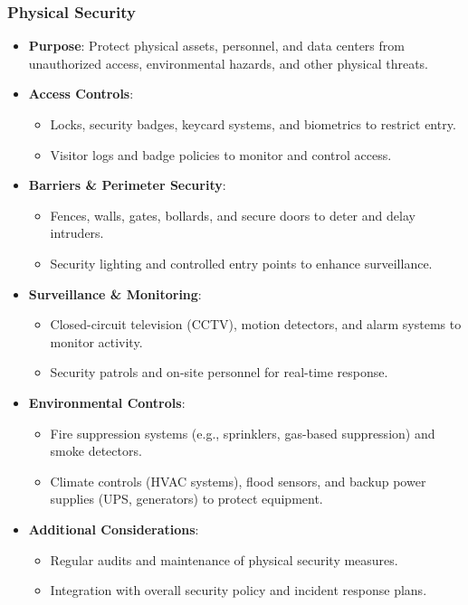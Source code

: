\documentclass[11pt]{article}
\begin{document}
\subsubsection{Physical Security}
\label{sec:org20cd1cc}
\begin{itemize}
\item \textbf{Purpose}: Protect physical assets, personnel, and data centers from unauthorized access, environmental hazards, and other physical threats.
\item \textbf{Access Controls}:
\begin{itemize}
\item Locks, security badges, keycard systems, and biometrics to restrict entry.
\item Visitor logs and badge policies to monitor and control access.
\end{itemize}
\item \textbf{Barriers \& Perimeter Security}:
\begin{itemize}
\item Fences, walls, gates, bollards, and secure doors to deter and delay intruders.
\item Security lighting and controlled entry points to enhance surveillance.
\end{itemize}
\item \textbf{Surveillance \& Monitoring}:
\begin{itemize}
\item Closed-circuit television (CCTV), motion detectors, and alarm systems to monitor activity.
\item Security patrols and on-site personnel for real-time response.
\end{itemize}
\item \textbf{Environmental Controls}:
\begin{itemize}
\item Fire suppression systems (e.g., sprinklers, gas-based suppression) and smoke detectors.
\item Climate controls (HVAC systems), flood sensors, and backup power supplies (UPS, generators) to protect equipment.
\end{itemize}
\item \textbf{Additional Considerations}:
\begin{itemize}
\item Regular audits and maintenance of physical security measures.
\item Integration with overall security policy and incident response plans.
\end{itemize}
\end{itemize}
\end{document}
